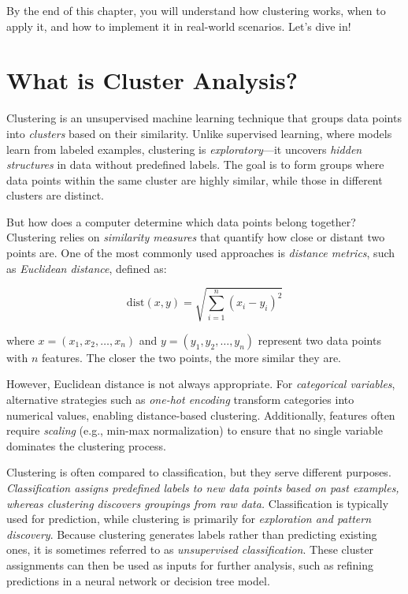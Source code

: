 \documentclass[
  11pt,
]{book}
\theoremstyle{definition}
\theoremstyle{definition}
\theoremstyle{definition}
\theoremstyle{definition}
\theoremstyle{remark}
\begin{document}
By the end of this chapter, you will understand how clustering works, when to apply it, and how to implement it in real-world scenarios. Let's dive in!

\section{What is Cluster Analysis?}\label{cluster-what}

Clustering is an unsupervised machine learning technique that groups data points into \emph{clusters} based on their similarity. Unlike supervised learning, where models learn from labeled examples, clustering is \emph{exploratory}---it uncovers \emph{hidden structures} in data without predefined labels. The goal is to form groups where data points within the same cluster are highly similar, while those in different clusters are distinct.

But how does a computer determine which data points belong together? Clustering relies on \emph{similarity measures} that quantify how close or distant two points are. One of the most commonly used approaches is \emph{distance metrics}, such as \emph{Euclidean distance}, defined as:

\[
\text{dist}(x, y) = \sqrt{ \sum_{i=1}^n (x_i - y_i)^2}
\]

where \(x = (x_1, x_2, \ldots, x_n)\) and \(y = (y_1, y_2, \ldots, y_n)\) represent two data points with \(n\) features. The closer the two points, the more similar they are.

However, Euclidean distance is not always appropriate. For \emph{categorical variables}, alternative strategies such as \emph{one-hot encoding} transform categories into numerical values, enabling distance-based clustering. Additionally, features often require \emph{scaling} (e.g., min-max normalization) to ensure that no single variable dominates the clustering process.

Clustering is often compared to classification, but they serve different purposes. \emph{Classification assigns predefined labels to new data points based on past examples, whereas clustering discovers groupings from raw data.} Classification is typically used for prediction, while clustering is primarily for \emph{exploration and pattern discovery}. Because clustering generates labels rather than predicting existing ones, it is sometimes referred to as \emph{unsupervised classification}. These cluster assignments can then be used as inputs for further analysis, such as refining predictions in a neural network or decision tree model.
\end{document}
